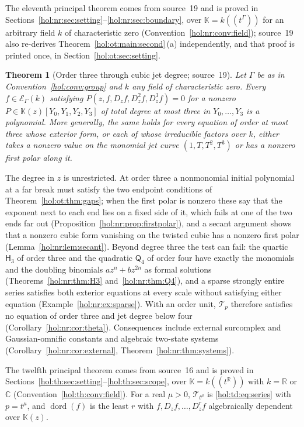 \documentclass[11pt]{article}
\numberwithin{equation}{section}
\newtheorem{maintheorem}{Theorem}
\theoremstyle{definition}
\theoremstyle{remark}
\newcommand{\C}{\mathbb C}
\newcommand{\R}{\mathbb R}
\newcommand{\KK}{\mathbb K}
\newcommand{\EK}{\mathcal E_\Gamma(k)}
\begin{document}
The eleventh principal theorem comes from source~19 and is proved in
Sections~\ref{hol:nr:sec:setting}--\ref{hol:nr:sec:boundary}, over
$\KK=k((t^\Gamma))$ for an arbitrary field $k$ of characteristic zero
(Convention~\ref{hol:nr:conv:field}); source~19 also re-derives
Theorem~\ref{hol:ot:main:second}\,(a) independently, and that proof is printed
once, in Section~\ref{hol:ot:sec:setting}.

\begin{maintheorem}[Order three through cubic jet degree; source~19]
\label{hol:nr:main:third}
Let $\Gamma$ be as in Convention~\ref{hol:conv:group} and $k$ any field of
characteristic zero. Every $f\in\EK$ satisfying
$P(z,f,D_zf,D_z^2f,D_z^3f)=0$ for a nonzero $P\in\KK(z)[Y_0,Y_1,Y_2,Y_3]$ of
total degree at most three in $Y_0,\ldots,Y_3$ is a polynomial. More
generally, the same holds for every equation of order at most three whose
exterior form, or each of whose irreducible factors over $k$, either takes a
nonzero value on the monomial jet curve $(1,T,T^2,T^3)$ or has a nonzero first
polar along it.
\end{maintheorem}

The degree in $z$ is unrestricted. At order three a nonmonomial initial
polynomial at a far break must satisfy the two endpoint conditions of
Theorem~\ref{hol:ot:thm:gaps}; when the first polar is nonzero these say that
the exponent next to each end lies on a fixed side of it, which fails at one of
the two ends far out (Proposition~\ref{hol:nr:prop:firstpolar}), and a secant
argument shows that a nonzero cubic form vanishing on the twisted cubic has a
nonzero first polar (Lemma~\ref{hol:nr:lem:secant}). Beyond degree three the
test can fail: the quartic $\mathsf H_3$ of order three and the quadratic
$\mathsf Q_4$ of order four have exactly the monomials and the doubling
binomials $az^n+bz^{2n}$ as formal solutions
(Theorems~\ref{hol:nr:thm:H3} and~\ref{hol:nr:thm:Q4}), and a sparse strongly
entire series satisfies both exterior equations at every scale without
satisfying either equation (Example~\ref{hol:nr:ex:sparse}). With an order
unit, $\mathcal T_p$ therefore satisfies no equation of order three and jet
degree below four (Corollary~\ref{hol:nr:cor:theta}). Consequences include
external surcomplex and Gaussian-omnific constants and algebraic two-state
systems (Corollary~\ref{hol:nr:cor:external},
Theorem~\ref{hol:nr:thm:systems}).

The twelfth principal theorem comes from source~16 and is proved in
Sections~\ref{hol:th:sec:setting}--\ref{hol:th:sec:scope}, over
$\KK=k((t^\R))$ with $k=\R$ or $\C$ (Convention~\ref{hol:th:conv:field}). For a
real $\mu>0$, $\mathcal T_{t^\mu}$ is \eqref{hol:td:eq:series} with $p=t^\mu$, and
$\operatorname{dord}(f)$ is the least $r$ with $f,D_zf,\ldots,D_z^rf$
algebraically dependent over $\KK(z)$.
\end{document}

